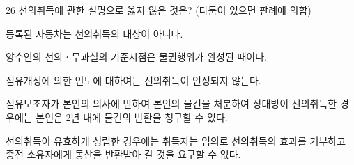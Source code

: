 \begin{question}{26}
선의취득에 관한 설명으로 옳지 않은 것은? (다툼이 있으면 판례에 의함)
\begin{choices}
  \item 등록된 자동차는 선의취득의 대상이 아니다.
  \item 양수인의 선의ㆍ무과실의 기준시점은 물권행위가 완성된 때이다.
  \item 점유개정에 의한 인도에 대하여는 선의취득이 인정되지 않는다.
  \item 점유보조자가 본인의 의사에 반하여 본인의 물건을 처분하여 상대방이 선의취득한 경우에는 본인은 2년 내에 물건의 반환을 청구할 수 있다.
  \item 선의취득이 유효하게 성립한 경우에는 취득자는 임의로 선의취득의 효과를 거부하고 종전 소유자에게 동산을 반환받아 갈 것을 요구할 수 없다.
\end{choices}
\end{question}
